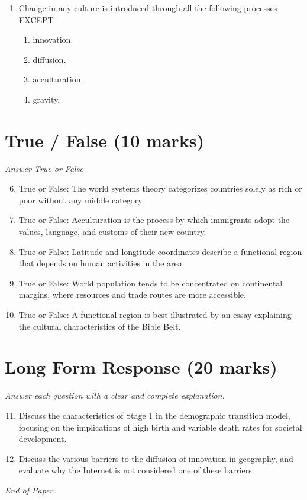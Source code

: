 \documentclass[12pt]{article}
\begin{document}
\begin{enumerate}[label=\arabic*.]
\begin{enumerate}[label=(\alph*)]
    \item replace agribusiness as the main focus of global food production.
\end{enumerate}
\item Change in any culture is introduced through all the following processes EXCEPT
\begin{enumerate}[label=(\alph*)]
    \item innovation.
    \item diffusion.
    \item acculturation.
    \item gravity.
\end{enumerate}
\end{enumerate}

\section*{True / False (10 marks)}
\textit{Answer True or False}
\begin{enumerate}[label=\arabic*.]
\setcounter{enumi}{5}
\item True or False: The world systems theory categorizes countries solely as rich or poor without any middle category.
\item True or False: Acculturation is the process by which immigrants adopt the values, language, and customs of their new country.
\item True or False: Latitude and longitude coordinates describe a functional region that depends on human activities in the area.
\item True or False: World population tends to be concentrated on continental margins, where resources and trade routes are more accessible.
\item True or False: A functional region is best illustrated by an essay explaining the cultural characteristics of the Bible Belt.
\end{enumerate}

\section*{Long Form Response (20 marks)}
\textit{Answer each question with a clear and complete explanation.}
\begin{enumerate}[label=\arabic*.]
\setcounter{enumi}{10}
\item Discuss the characteristics of Stage 1 in the demographic transition model, focusing on the implications of high birth and variable death rates for societal development.
\item Discuss the various barriers to the diffusion of innovation in geography, and evaluate why the Internet is not considered one of these barriers.
\end{enumerate}

\vfill
\noindent\textit{End of Paper}
\end{document}

